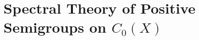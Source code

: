 \setcounter{chapter}{2}
\chapter{Spectral Theory of Positive Semigroups on \texorpdfstring{$C_{0}(X)$}{C_0(X)}}\label{chap:b3}





%
%